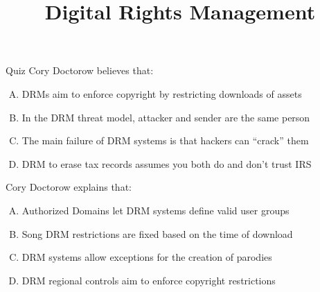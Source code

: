 \documentclass{beamer}
\title{Digital Rights Management}
\date{}
\begin{document}
\begin{frame}
\titlepage
\end{frame}

\begin{frame}{Quiz}
Cory Doctorow believes that:
\begin{enumerate}[(A)]
\item<1> DRMs aim to enforce copyright by restricting downloads of assets %
\item<1> In the DRM threat model, attacker and sender are the same person %
\item<1> The main failure of DRM systems is that hackers can ``crack'' them %
\item<1-2> DRM to erase tax records assumes you both do and don't trust IRS
\end{enumerate}
\bigskip
Cory Doctorow explains that:
\begin{enumerate}[(A)]
\item<1-2> Authorized Domains let DRM systems define valid user groups
\item<1> Song DRM restrictions are fixed based on the time of download
\item<1> DRM systems allow exceptions for the creation of parodies
\item<1> DRM regional controls aim to enforce copyright restrictions
\end{enumerate}
\end{frame}
\end{document}
